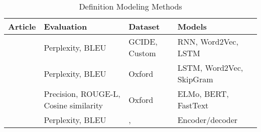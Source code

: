 \begin{longtable}{|p{3.5cm}|p{3.5cm}|p{3.5cm}|p{3.5cm}|}
    \caption{Definition Modeling Methods}                                                                                                                                                                                                                                                                                                                                                   \\
    \hline
    Article                                                                                                                   & Evaluation                                                       & Dataset                                                                                                                                       & Models                                   \\
    \hline
    \citeauthor*{noraset_definition_2016} \citeyear{noraset_definition_2016} \cite{noraset_definition_2016}                   & Perplexity, BLEU                                                 & GCIDE, Custom                                                                                                                                 & RNN, Word2Vec, LSTM                      \\
    \hline
    \citeauthor*{gadetsky_conditional_2018} \citeyear{gadetsky_conditional_2018} \cite{gadetsky_conditional_2018}             & Perplexity, BLEU                                                 & Oxford                                                                                                                                        & LSTM, Word2Vec, SkipGram                 \\
    \hline
    \citeauthor*{chang_what_2019} \citeyear{chang_what_2019} \cite{chang_what_2019}                                           & Precision, ROUGE-L, Cosine similarity                            & Oxford                                                                                                                                        & ELMo, BERT, FastText                     \\
    \hline
    \citeauthor*{washio_bridging_2019} \citeyear{washio_bridging_2019} \cite{washio_bridging_2019}                            & Perplexity, BLEU                                                 & \cite{noraset_definition_2016}, \cite{gadetsky_conditional_2018}                                                                              & Encoder/decoder                          \\

\end{longtable}
